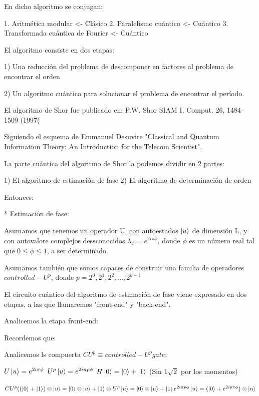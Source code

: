 \documentclass[11pt, spanish]{report}
\begin{document}
En dicho algoritmo se conjugan:

1. Aritmética modular <- Clásico
2. Paralelismo cuántico <- Cuántico
3. Transformada cuántica de Fourier <- Cuántico

El algoritmo consiste en dos etapas:

1) Una reducción del problema de descomponer en factores al problema de encontrar el orden

2) Un algoritmo cuántico para solucionar el problema de encontrar el período.

El algoritmo de Shor fue publicado en: P.W. Shor SIAM I. Comput. 26, 1484-1509 (1997(

Siguiendo el esquema de Emmanuel Desuvire "Classical and Quantum Information Theory: An Introduction for the Telecom Scientist".

La parte cuántica del algoritmo de Shor la podemos dividir en 2 partes:

1) El algoritmo de estimación de fase
2) El algoritmo de determinación de orden

Entonces:

* Estimación de fase:

Asumamos que tenemos un operador U, con autoestados $\ket{u}$ de dimensión L, y con autovalore complejos dessconocidos $\lambda_\phi = e^{2 i \pi \phi}$, donde $\phi$ es un número real tal que $0 \leq \phi \leq 1$, a ser determinado.

Asumamos también que somos capaces de construir una familia de operadores $controlled-U^p$, donde $p = 2^0, 2^1, 2^2, ..., 2^{k-1}$

El circuito cuántico del algoritmo de estimación de fase viene expresado en dos etapas, a las que llamaremos "front-end" y "back-end".

Analicemos la etapa front-end:


Recordemos que:


Analicemos ls compuerta $CU^p \equiv controlled-U^p gate$:


$U \ket{u} = e^{2 i \pi \phi}$
$U^p \ket{u} = e^{2 i \pi p \phi}$
$H \ket{0} = \ket{0} + \ket{1}$ (Sin $1\sqrt{2}$ por los momentos)

$CU^p ((\ket{0} + \ket{1}) \otimes \ket{u} = \ket{0} \otimes \ket{u} + \ket{1} \otimes U^p \ket{u} = \ket{0} \otimes \ket{u} + \ket{1} e^{2i \pi p \phi} \ket{u} = (\ket{0} + e^{2 i p \pi \phi}) \otimes \ket{u}$
\end{document}
